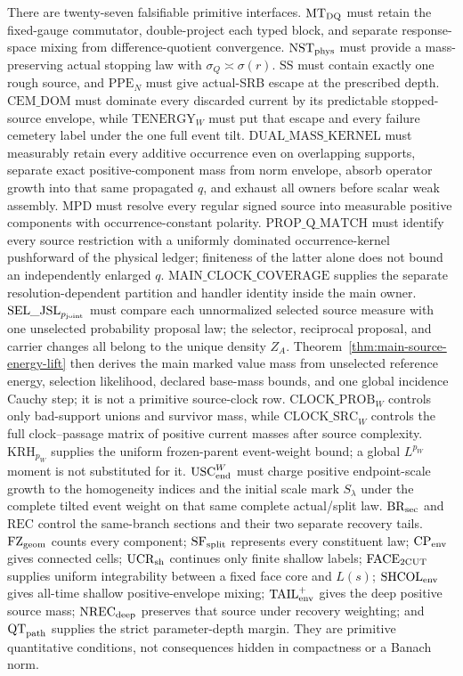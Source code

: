 \documentclass[11pt]{article}
\begin{document}
There are twenty-seven falsifiable primitive interfaces.  $\mathrm{MT}_{\rm DQ}$ must
retain the fixed-gauge commutator, double-project each typed block, and
separate response-space mixing from difference-quotient convergence.
$\mathrm{NST}_{\rm phys}$ must provide a
mass-preserving actual stopping law with
$\sigma_Q\asymp\sigma(r)$.  $\mathrm{SS}$ must contain exactly one rough source, and
$\mathrm{PPE}_{N}$ must give actual-SRB escape at the prescribed depth.
$\mathrm{CEM\_DOM}$ must dominate every discarded current by its predictable
stopped-source envelope, while $\mathrm{TENERGY}_{W}$ must put that escape
and every failure cemetery label under the one full event tilt.
$\mathrm{DUAL\_MASS\_KERNEL}$ must measurably retain every additive
occurrence even on overlapping supports, separate exact positive-component
mass from norm
envelope, absorb operator growth into that same propagated $q$, and exhaust
all owners before scalar weak assembly.  $\mathrm{MPD}$ must resolve every
regular signed source into measurable positive components with
occurrence-constant polarity.  $\mathrm{PROP\_Q\_MATCH}$ must identify every
source restriction with a uniformly dominated occurrence-kernel pushforward
of the physical ledger; finiteness of the latter alone does not bound an
independently enlarged $q$.  $\mathrm{MAIN\_CLOCK\_COVERAGE}$ supplies the
separate resolution-dependent partition and handler identity inside the
main owner.  $\mathrm{SEL\_JSL}_{p_{\rm joint}}$ must compare each
unnormalized selected source measure with one unselected probability proposal
law; the selector, reciprocal proposal, and carrier changes all belong to
the unique density $Z_A$.  Theorem~\ref{thm:main-source-energy-lift} then
derives the main marked value mass from unselected reference energy,
selection likelihood, declared base-mass bounds, and one global incidence
Cauchy step; it is not a primitive source-clock row.  $\mathrm{CLOCK\_PROB}_{W}$
controls only bad-support
unions and survivor mass, while $\mathrm{CLOCK\_SRC}_{W}$ controls the full
clock--passage matrix of positive current masses after source complexity.
$\mathrm{KRH}_{p_W}$ supplies the uniform frozen-parent event-weight bound;
a global $L^{p_W}$ moment is not substituted for it.
$\mathrm{USC}_{\rm end}^{W}$ must charge positive endpoint-scale growth to the
homogeneity indices and the initial scale mark $S_\lambda$ under the complete
tilted event weight on that same complete actual/split law.
$\mathrm{BR}_{\rm sec}$ and $\mathrm{REC}$ control the same-branch
sections and their two separate recovery tails.
$\mathrm{FZ}_{\rm geom}$ counts every component;
$\mathrm{SF}_{\rm split}$ represents every constituent law;
$\mathrm{CP}_{\rm env}$ gives connected cells;
$\mathrm{UCR}_{\rm sh}$ continues only finite shallow labels;
$\mathrm{FACE}_{\rm 2CUT}$ supplies uniform integrability between a fixed
face core and $L(s)$;
$\mathrm{SHCOL}_{\rm env}$ gives all-time shallow positive-envelope
mixing; $\mathrm{TAIL}_{\rm env}^{+}$ gives the deep positive source mass;
$\mathrm{NREC}_{\rm deep}$ preserves that source under recovery weighting;
and $\mathrm{QT}_{\rm path}$ supplies the strict parameter-depth margin.
They are primitive quantitative conditions, not consequences hidden in
compactness or a Banach norm.
\end{document}
